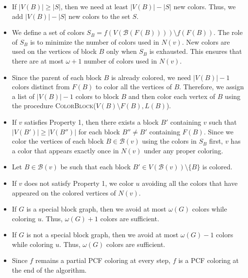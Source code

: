 \documentclass[11pt]{article}
\theoremstyle{plain}
\newcounter{procedure}
\begin{document}
	\begin{itemize}
		\item If $|V(B)|\geq |S|$, then we need at least $|V(B)|-|S|$ new colors. Thus, we add $|V(B)|-|S|$ new colors to the set $S$.
		\item We define a set of colors $S_B = f(V(\mathcal{B}(F(B))))\setminus f(F(B))$.
		The role of $S_B$ is to minimize the number of colors used in $N(v)$.
		New colors are used on the vertices of block $B$ only when $S_B$ is exhausted. This ensures that there are at most $\omega+1$ number of colors used in $N(v)$.
		\item Since the parent of each block $B$ is already colored, we need $|V(B)|-1$ colors distinct from $F(B)$ to color all the vertices of $B$. Therefore, we assign a list of $|V(B)|-1$ colors to block $B$ and then color each vertex of $B$ using the procedure \textsc{ColorBlock}($V(B)\setminus F(B), L(B)$).
		\item If $v$ satisfies \textsf{Property 1}, then there exists a block $B'$ containing $v$ such that $|V(B')|\geq |V(B'')|$ for each block $B''\neq B'$ containing $F(B)$.
		Since we color the vertices of each block $B\in \mathcal{B}(v)$ using the colors in $S_B$ first, $v$ has a color that appears exactly once in $N(v)$ under any proper coloring.
		\item Let $B\in \mathcal{B}(v)$ be such that each block $B'\in V(\mathcal{B}(v))\setminus\{B\}$ is colored.
		\item If $v$ does not satisfy \textsf{Property 1}, we color $u$ avoiding all the colors that have appeared on the colored vertices of $N(v)$.
		\item If $G$ is a special block graph, then we avoid at most $\omega(G)$ colors while coloring $u$. Thus, $\omega(G)+1$ colors are sufficient.
		\item If $G$ is not a special block graph, then we avoid at most $\omega(G)-1$ colors while coloring $u$. Thus, $\omega(G)$ colors are sufficient.
		\item Since $f$ remains a partial PCF coloring at every step, $f$ is a PCF coloring at the end of the algorithm.
	\end{itemize}
	
	\begin{procedure}[H]
	\end{procedure}
	
\end{document}
